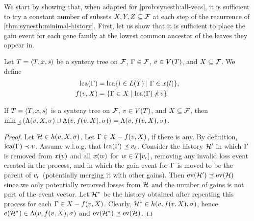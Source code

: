 We start by showing that, when adapted for \cref{prob:synesth:all-vecs}, it is sufficient to try a constant number of subsets \(X, Y, Z \subseteq \mathcal{F}\) at each step of the recurrence of \cref{thm:synesth:minimal-history}.
First, let us show that it is sufficient to place the gain event for each gene family at the lowest common ancestor of the leaves they appear in.

\begin{definition}
    Let
        \(T = \left\langle T, x, s\right\rangle\) be a synteny tree on \(\mathcal{F}\),
        \(\Gamma \in \mathcal{F}\),
        \(v \in V(T)\),
        and \(X \subseteq \mathcal{F}\).
    We define \begin{align*}
        \lca(\geneFamily) &= \lca\{l \in \tleavs(T) \mid \geneFamily \in \syntenyOf(l)\}, \\
        f(v, X) &= \{\geneFamily \in X \mid \lca(\geneFamily) \nottdescneq v\}. \qedhere
    \end{align*}
\end{definition}

\begin{lemma}\label{lem:gains-lca-vec}
    If
        \(T = \left\langle T, x, s\right\rangle\) is a synteny tree on \(\mathcal{F}\),
        \(v \in V(T)\),
        and \(X \subseteq \mathcal{F}\),
    then
        \(\min{}_{\preceq}\,(\Lambda(v, X, \sigma) \cup \Lambda(v, f(v, X), \sigma)) = \Lambda(v, f(v, X), \sigma)\).
\end{lemma}
\begin{proof}
    Let \(\mathcal{H} \in h(v, X, \sigma)\).
    Let \(\Gamma \in X - f(v, X)\), if there is any.
    By definition, \(\mathrm{lca}(\Gamma) \prec v\).
    Assume w.l.o.g. that \(\mathrm{lca}(\Gamma) \preceq v_\mathit{\ell}\).
    Consider the history \(\mathcal{H}'\) in which
        \(\Gamma\) is removed from \(x(v)\)
        and all \(x(w)\) for \(w \in T[v_r]\),
        removing any invalid loss event created in the process,
        and in which the gain event for \(\Gamma\) is moved to be the parent of \(v_r\)
        (potentially merging it with other gains).
    Then \(\mathrm{ev}(\mathcal{H}') \preceq \mathrm{ev}(\mathcal{H})\) since we only potentially removed losses from \(\mathcal{H}\) and the number of gains is not part of the event vector.
    Let \(\mathcal{H}^*\) be the history obtained after repeating this process for each \(\Gamma \in X - f(v, X)\).
    Clearly, \(\mathcal{H}^* \in h(v, f(v, X), \sigma)\), hence \(e(\mathcal{H}^*) \in \Lambda(v, f(v, X), \sigma)\) and \(\mathrm{ev}(\mathcal{H}^*) \preceq \mathrm{ev}(\mathcal{H})\).
\end{proof}

